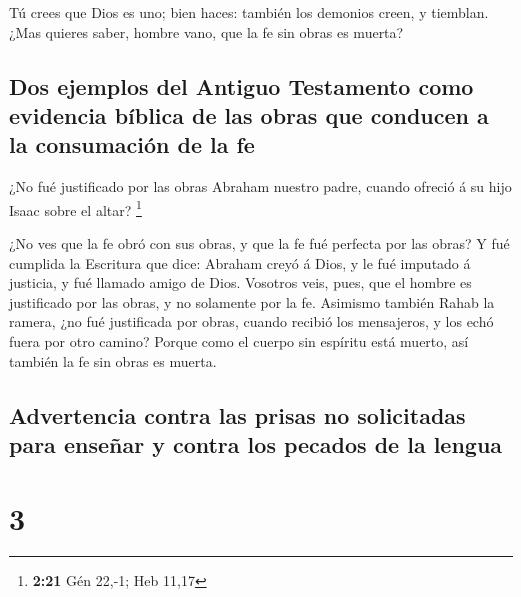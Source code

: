  Tú crees que Dios es uno; bien haces: también los demonios
creen, y tiemblan.  ¿Mas quieres saber, hombre vano, que la
fe sin obras es muerta?

\hypertarget{dos-ejemplos-del-antiguo-testamento-como-evidencia-buxedblica-de-las-obras-que-conducen-a-la-consumaciuxf3n-de-la-fe}{%
\subsection{Dos ejemplos del Antiguo Testamento como evidencia bíblica
de las obras que conducen a la consumación de la
fe}\label{dos-ejemplos-del-antiguo-testamento-como-evidencia-buxedblica-de-las-obras-que-conducen-a-la-consumaciuxf3n-de-la-fe}}

 ¿No fué justificado por las obras Abraham nuestro padre,
cuando ofreció á su hijo Isaac sobre el altar? \footnote{\textbf{2:21}
  Gén 22,-1; Heb 11,17}

 ¿No ves que la fe obró con sus obras, y que la fe fué
perfecta por las obras?  Y fué cumplida la Escritura que
dice: Abraham creyó á Dios, y le fué imputado á justicia, y fué llamado
amigo de Dios.  Vosotros veis, pues, que el hombre es
justificado por las obras, y no solamente por la fe. 
Asimismo también Rahab la ramera, ¿no fué justificada por obras, cuando
recibió los mensajeros, y los echó fuera por otro camino? 
Porque como el cuerpo sin espíritu está muerto, así también la fe sin
obras es muerta.

\hypertarget{advertencia-contra-las-prisas-no-solicitadas-para-enseuxf1ar-y-contra-los-pecados-de-la-lengua}{%
\subsection{Advertencia contra las prisas no solicitadas para enseñar y
contra los pecados de la
lengua}\label{advertencia-contra-las-prisas-no-solicitadas-para-enseuxf1ar-y-contra-los-pecados-de-la-lengua}}

\hypertarget{section-2}{%
\section{3}\label{section-2}}

